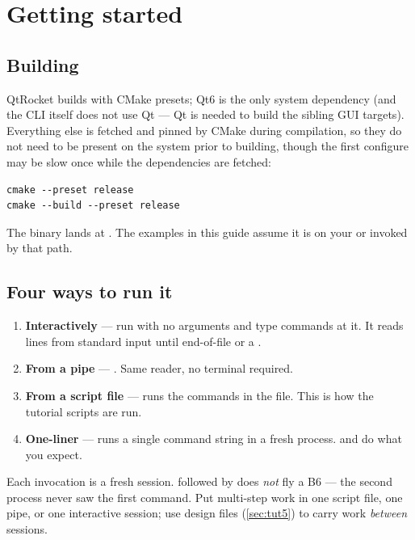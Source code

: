 \section{Getting started}\label{sec:getting-started}

\subsection{Building }

QtRocket builds with CMake presets; Qt6 is the only system dependency (and the
CLI itself does not use Qt --- Qt is needed to build the sibling GUI targets).
Everything else is fetched and pinned by CMake during compilation, so they do not
need to be present on the system prior to building, though the first configure may
be slow once while the dependencies are fetched:

\begin{verbatim}
cmake --preset release
cmake --build --preset release
\end{verbatim}

The binary lands at . The examples in this guide
assume it is on your  or invoked by that path.

\subsection{Four ways to run it}\label{sec:invocation}

\begin{enumerate}
\item \textbf{Interactively} --- run  with no arguments and
      type commands at it. It reads lines from standard input until
      end-of-file or a .
\item \textbf{From a pipe} --- .
      Same reader, no terminal required.
\item \textbf{From a script file} ---  runs the
      commands in the file. This is how the tutorial scripts are run.
\item \textbf{One-liner} ---  runs a single
      command string in a fresh process.  and 
      do what you expect.
\end{enumerate}

\begin{warning}
Each invocation is a fresh session. 
followed by  does \emph{not} fly a B6 --- the
second process never saw the first command. Put multi-step work in one script
file, one pipe, or one interactive session; use  design files
(\cref{sec:tut5}) to carry work \emph{between} sessions.
\end{warning}


